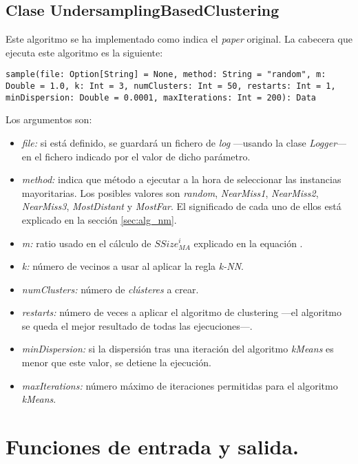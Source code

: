 \subsection{Clase UndersamplingBasedClustering} \label{subsec:impl_undersamplingbasedclustering}

Este algoritmo se ha implementado como indica el \textit{paper} original. La cabecera que ejecuta este algoritmo es la siguiente:

\begin{lstlisting}[frame=single, basicstyle=\scriptsize, breaklines=true]
sample(file: Option[String] = None, method: String = "random", m: Double = 1.0, k: Int = 3, numClusters: Int = 50, restarts: Int = 1, minDispersion: Double = 0.0001, maxIterations: Int = 200): Data
\end{lstlisting}

Los argumentos son:

\begin{itemize}
    \item \textit{file:} si está definido, se guardará un fichero de \textit{log} —usando la clase \textit{Logger}— en el fichero indicado por el valor de dicho parámetro.
    \item \textit{method:} indica que método a ejecutar a la hora de seleccionar las instancias mayoritarias. Los posibles valores son \textit{random}, \textit{NearMiss1}, \textit{NearMiss2}, \textit{NearMiss3}, \textit{MostDistant} y \textit{MostFar}. El significado de cada uno de ellos está explicado en la sección \ref {sec:alg_nm}.
    \item \textit{m:} ratio usado en el cálculo de $SSize_{MA}^{i}$ explicado en la equación \label{eq:sbc}.
    \item \textit{k:} número de vecinos a usar al aplicar la regla \textit{k-NN}.
    \item \textit{numClusters:} número de \textit{clústeres} a crear.
    \item \textit{restarts:} número de veces a aplicar el algoritmo de clustering —el algoritmo se queda el mejor resultado de todas las ejecuciones—.
    \item \textit{minDispersion:} si la dispersión tras una iteración del algoritmo \textit{kMeans} es menor que este valor, se detiene la ejecución.
    \item \textit{maxIterations:} número máximo de iteraciones permitidas para el algoritmo \textit{kMeans}.
\end{itemize}

\section{Funciones de entrada y salida.} \label{sec:entrada_salida}

